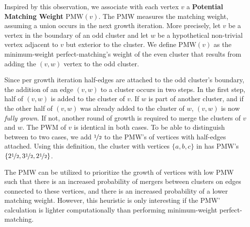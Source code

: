 Inspired by this observation, we associate with each vertex $v$ a \textbf{Potential Matching Weight} $\text{PMW}(v)$. The PMW measures the matching weight, assuming a union occurs in the next growth iteration. More precisely,
let $v$ be a vertex in the boundary of an odd cluster and let $w$ be a hypothetical non-trivial vertex adjacent to $v$ but exterior to the cluster. We define $\text{PMW}(v)$ as the minimum-weight perfect-matching's weight of the even cluster that results from adding the $(v,w)$ vertex to the odd cluster. %
    
Since per growth iteration half-edges are attached to the odd cluster's boundary, the addition of an edge $(v,w)$ to a cluster occurs in two steps. In the first step, half of $(v,w)$ is added to the cluster of $v$. If $w$ is part of another cluster, and if the other half of $(v,w)$ was already added to the cluster of $w$, $(v,w)$ is now \emph{fully grown}. If not, another round of growth is required to merge the clusters of $v$ and $w$. The PWM of $v$ is identical in both cases. To be able to distinguish between to two cases, we add $\nicefrac{1}{2}$ to the PMW's of vertices with half-edges attached. Using this definition, the cluster with vertices $\{a,b,c\}$ in  has PMW's $\{2\nicefrac{1}{2}, 3\nicefrac{1}{2}, 2\nicefrac{1}{2}\}$.

The PMW can be utilized to prioritize the growth of vertices with low PMW such that there is an increased probability of mergers between clusters on edges connected to these vertices, and there is an increased probability of a lower matching weight. However, this heuristic is only interesting if the PMW' calculation is lighter computationally than performing minimum-weight perfect-matching. %


